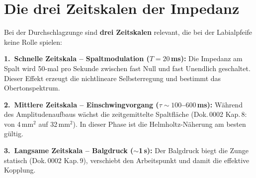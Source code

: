 \documentclass[11pt,a4paper]{article}
\begin{document}
\begin{table}[H]
\centering\small
{}
\caption{Quantitativer Vergleich Orgelpfeife (C2 gedackt) vs.\ Basszunge (50\,Hz)}
\end{table}

\section{Die drei Zeitskalen der Impedanz}

Bei der Durchschlagzunge sind \textbf{drei Zeitskalen} relevant, die bei der Labialpfeife keine Rolle spielen:

\textbf{1.\ Schnelle Zeitskala -- Spaltmodulation ($T = 20$\,ms):} Die Impedanz am Spalt wird 50-mal pro Sekunde zwischen fast Null und fast Unendlich geschaltet. Dieser Effekt erzeugt die nichtlineare Selbsterregung und bestimmt das Obertonspektrum.

\textbf{2.\ Mittlere Zeitskala -- Einschwingvorgang ($\tau \sim 100$--$600$\,ms):} Während des Amplitudenaufbaus wächst die zeitgemittelte Spaltfläche (Dok.\,0002 Kap.\,8: von 4\,mm$^2$ auf 32\,mm$^2$). In dieser Phase ist die Helmholtz-Näherung am besten gültig.

\textbf{3.\ Langsame Zeitskala -- Balgdruck ($\sim$1\,s):} Der Balgdruck biegt die Zunge statisch (Dok.\,0002 Kap.\,9), verschiebt den Arbeitspunkt und damit die effektive Kopplung.

\end{document}
